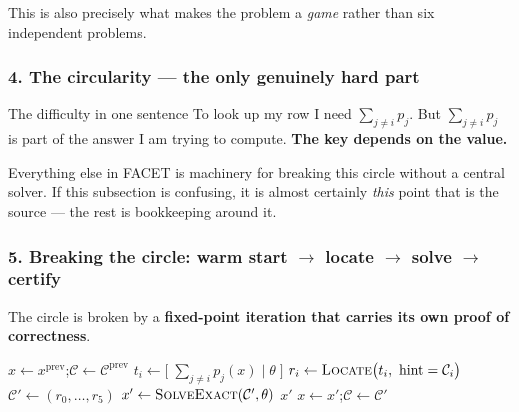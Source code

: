 \documentclass[11pt, letterpaper]{article}
\begin{document}
This is also precisely what makes the problem a \emph{game} rather than six independent problems.

\subsubsection*{4. The circularity --- the only genuinely hard part}
\begin{warnbox}{The difficulty in one sentence}
To look up my row I need $\sum_{j\ne i}p_j$. But $\sum_{j\ne i}p_j$ is part of the answer I am trying
to compute. \textbf{The key depends on the value.}
\end{warnbox}
Everything else in FACET is machinery for breaking this circle without a central solver. If this
subsection is confusing, it is almost certainly \emph{this} point that is the source --- the rest is
bookkeeping around it.

\subsubsection*{5. Breaking the circle: warm start $\to$ locate $\to$ solve $\to$ certify}
The circle is broken by a \textbf{fixed-point iteration that carries its own proof of correctness}.

\begin{algorithm}[H]
\caption{One FACET clearing step (Tier 1). In: $\theta$, previous solution $x^{\mathrm{prev}}$,
previous combination $\mathcal C^{\mathrm{prev}}$. Out: a certified GNE $x^\star$.}
\label{alg:facet}
\begin{algorithmic}[1]
\State $x\gets x^{\mathrm{prev}}$;\quad $\mathcal C\gets\mathcal C^{\mathrm{prev}}$
    \State $t_i\gets\bigl[\;\sum_{j\ne i}p_j(x)\;\big|\;\theta\;\bigr]$
    \State $r_i\gets\textsc{Locate}\bigl(t_i,\ \mathrm{hint}=\mathcal C_i\bigr)$
  \EndFor
  \State $\mathcal C'\gets(r_0,\dots,r_5)$
  \State $x'\gets\textsc{SolveExact}(\mathcal C',\theta)$
    \State \Return $x'$
  \EndIf
  \State $x\gets x'$;\quad $\mathcal C\gets\mathcal C'$
\EndFor
\end{algorithmic}
\end{algorithm}
\end{document}
